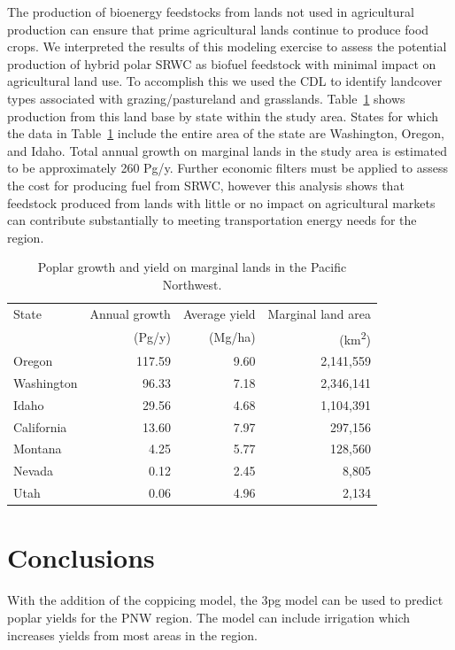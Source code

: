 \documentclass[preprint,review,12pt]{elsarticle}
\begin{document}
The production of bioenergy feedstocks from lands not used in
agricultural production can ensure that prime agricultural lands
continue to produce food crops. We interpreted the results of this
modeling exercise to assess the potential production of hybrid polar
\ac{SRWC} as biofuel feedstock with minimal impact on agricultural
land use. To accomplish this we used the \ac{CDL} to identify
landcover types associated with grazing/pastureland and
grasslands. Table~\ref{tab:growth} shows production from this land
base by state within the study area. States for which the data in
Table~\ref{tab:growth} include the entire area of the state are
Washington, Oregon, and Idaho. Total annual growth on marginal lands
in the study area is estimated to be approximately 260 Pg/y. Further
economic filters must be applied to assess the cost for producing fuel
from \ac{SRWC}, however this analysis shows that feedstock produced
from lands with little or no impact on agricultural markets can
contribute substantially to meeting transportation energy needs for
the region.
\begin{table}[htbp]
\caption{Poplar growth and yield on marginal lands in the Pacific Northwest.}
\begin{tabular}{ |lrrr|}
\hline
State &  Annual growth & Average yield & Marginal land area \\
& (Pg/y)& (Mg/ha) & (km\textsuperscript{2}) \\
\hline
Oregon & 117.59 & 9.60 &  2,141,559 \\
Washington & 96.33 & 7.18 &  2,346,141 \\
Idaho & 29.56 & 4.68 &  1,104,391 \\
California & 13.60 & 7.97 &    297,156 \\
Montana & 4.25 & 5.77 &    128,560 \\
Nevada & 0.12 & 2.45 &      8,805 \\
Utah & 0.06 & 4.96 &      2,134 \\
\hline
\end{tabular}

\label{tab:growth}
\end{table}

\section{Conclusions}
\label{sec:conclude}

With the addition of the coppicing model, the \ac{3pg} model can be
used to predict poplar yields for the \ac{PNW} region.  The model can
include irrigation which increases yields from most areas in the region.  
\end{document}
